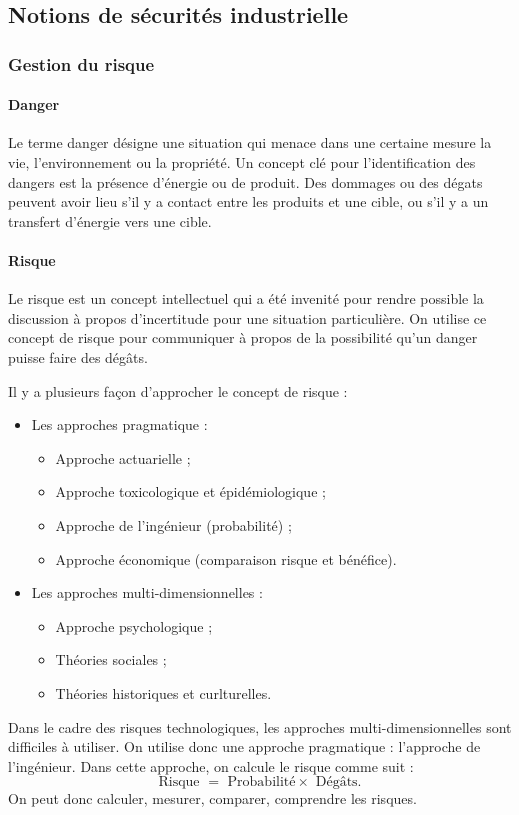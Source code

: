 \subsection{Notions de sécurités industrielle}
\subsubsection{Gestion du risque}
\paragraph{Danger} Le terme danger désigne une situation
qui menace dans une certaine mesure la vie, l'environnement
ou la propriété.
Un concept clé pour l'identification des dangers est la
présence d'énergie ou de produit. Des dommages ou des dégats
peuvent avoir lieu s'il y a contact entre les produits
et une cible, ou s'il y a un transfert d'énergie vers une cible.
\paragraph{Risque} Le risque est un concept intellectuel qui
a été invenité pour rendre possible la discussion à propos
d'incertitude pour une situation particulière. On utilise
ce concept de risque pour communiquer à propos de la
possibilité qu'un danger puisse faire des dégâts.

Il y a plusieurs façon d'approcher le concept de risque :
\begin{itemize}
	\item Les approches pragmatique :
	\begin{itemize}
		\item Approche actuarielle ;
		\item Approche toxicologique et épidémiologique ;
		\item Approche de l'ingénieur (probabilité) ;
		\item Approche économique (comparaison risque et
		bénéfice).
	\end{itemize}
	\item Les approches multi-dimensionnelles :
	\begin{itemize}
		\item Approche psychologique ;
		\item Théories sociales ;
		\item Théories historiques et curlturelles.
	\end{itemize}
\end{itemize}

Dans le cadre des risques technologiques, les approches
multi-dimensionnelles sont difficiles à utiliser. On
utilise donc une approche pragmatique : l'approche
de l'ingénieur. Dans cette approche, on calcule le risque
comme suit :
\[ \text{Risque } = \text{ Probabilité} \times \text{ Dégâts}. \]
On peut donc calculer, mesurer, comparer, comprendre les
risques.

